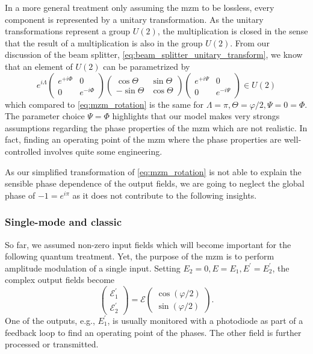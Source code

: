 In a more general treatment only assuming the \gls{mzm} to be lossless, every component is represented by a unitary transformation.
As the unitary transformations represent a group $U(2)$, the multiplication is closed in the sense that the result of a multiplication is also in the group $U(2)$.
From our discussion of the beam splitter, \cref{eq:beam_splitter_unitary_transform}, we know that an element of $U(2)$ can be parametrized by
\begin{equation}
    e^{i\Lambda}
    \begin{pmatrix}
        e^{+i\Phi} & 0
        \\
        0 & e^{-i\Phi}
    \end{pmatrix}
    \begin{pmatrix}
        \cos\Theta & \sin\Theta
        \\
        -\sin\Theta & \cos\Theta
    \end{pmatrix}
    \begin{pmatrix}
        e^{+i\Psi} & 0
        \\
        0 & e^{-i\Psi}
    \end{pmatrix}
    \in U(2)
\end{equation}
which compared to \cref{eq:mzm_rotation} is the same for $\Lambda=\pi,\Theta=\varphi/2,\Psi=0=\Phi$.
The parameter choice $\Psi=\Phi$ highlights that our model makes very strongs assumptions regarding the phase properties of the \gls{mzm} which are not realistic.
In fact, finding an operating point of the \gls{mzm} where the phase properties are well-controlled involves quite some engineering.

As our simplified transformation of \cref{eq:mzm_rotation} is not able to explain the sensible phase dependence of the output fields, we are going to neglect the global phase of $-1=e^{i\pi}$ as it does not contribute to the following insights.

\subsubsection{Single-mode and classic}

So far, we assumed non-zero input fields which will become important for the following quantum treatment.
Yet, the purpose of the \gls{mzm} is to perform amplitude modulation of a single input.
Setting $E_2=0,E=E_1,E^\prime=E_2^\prime$, the complex output fields become
\begin{equation}
    \begin{pmatrix}
        \mathcal{E}_1^\prime
        \\
        \mathcal{E}_2^\prime
    \end{pmatrix}
    =
    \mathcal{E}
    \begin{pmatrix}
        \cos(\varphi/2)
        \\
        \sin(\varphi/2)
    \end{pmatrix}
    \label{eq:mzm_classic_sm}.
\end{equation}
One of the outputs, e.g., $E_1^\prime$, is usually monitored with a photodiode as part of a feedback loop to find an operating point of the phases.
The other field is further processed or transmitted.

